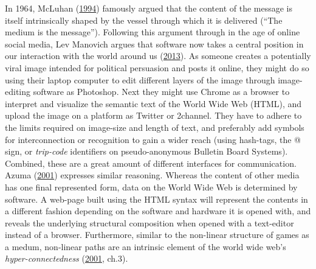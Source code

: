\documentclass[10pt,british,A4paper,twoside]{memoir}
\begin{document}
In 1964, McLuhan
(\protect\hyperlink{ref-mcluhan_understanding_1994}{1994}) famously
argued that the content of the message is itself intrinsically shaped by
the vessel through which it is delivered (``The medium is the
message''). Following this argument through in the age of online social
media, Lev Manovich argues that software now takes a central position in
our interaction with the world around us
(\protect\hyperlink{ref-manovich_software_2013}{2013}). As someone
creates a potentially viral image intended for political persuasion and
posts it online, they might do so using their laptop computer to edit
different layers of the image through image-editing software as
Photoshop. Next they might use Chrome as a browser to interpret and
visualize the semantic text of the World Wide Web (HTML), and upload the
image on a platform as Twitter or 2channel. They have to adhere to the
limits required on image-size and length of text, and preferably add
symbols for interconnection or recognition to gain a wider reach (using
hash-tags, the @ sign, or \emph{trip-code} identifiers on
pseudo-anonymous Bulletin Board Systems). Combined, these are a great
amount of different interfaces for communication. Azuma
(\protect\hyperlink{ref-azuma_otaku:_2001}{2001}) expresses similar
reasoning. Whereas the content of other media has one final represented
form, data on the World Wide Web is determined by software. A web-page
built using the HTML syntax will represent the contents in a different
fashion depending on the software and hardware it is opened with, and
reveals the underlying structural composition when opened with a
text-editor instead of a browser. Furthermore, similar to the non-linear
structure of games as a medum, non-linear paths are an intrinsic element of the
world wide web's \emph{hyper-connectedness}
(\protect\hyperlink{ref-azuma_otaku:_2001}{2001}, ch.3).
\end{document}
